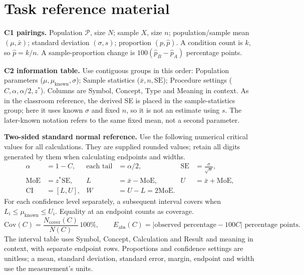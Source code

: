 \clearpage
\section*{Task reference material}
\textbf{C1 pairings.} Population $\mathcal P$, size $N$; sample $X$, size $n$; population/sample mean $(\mu,\bar x)$; standard deviation $(\sigma,s)$; proportion $(p,\hat p)$. A condition count is $k$, so $\hat p=k/n$. A sample-proportion change is $100(\hat p_B-\hat p_A)$ percentage points.

\textbf{C2 information table.} Use contiguous groups in this order: Population parameters ($\mu,\mu_{\mathrm{known}},\sigma$); Sample statistics ($\bar x,n,\mathrm{SE}$); Procedure settings ($C,\alpha,\alpha/2,z^*$). Columns are Symbol, Concept, Type and Meaning in context. As in the classroom reference, the derived SE is placed in the sample-statistics group; here it uses known $\sigma$ and fixed $n$, so it is not an estimate using $s$. The later-known notation refers to the same fixed mean, not a second parameter.

\textbf{Two-sided standard normal reference.} Use the following numerical critical values for all calculations. They are supplied rounded values; retain all digits generated by them when calculating endpoints and widths.
\[
\begin{aligned}
\alpha&=1-C,& \text{each tail}&=\alpha/2,&\mathrm{SE}&=\frac{\sigma}{\sqrt n},\\
\mathrm{MoE}&=z^*\mathrm{SE},&L&=\bar x-\mathrm{MoE},&U&=\bar x+\mathrm{MoE},\\
\mathrm{CI}&=[L,U],&W&=U-L=2\mathrm{MoE}.&&
\end{aligned}
\]
For each confidence level separately, a subsequent interval covers when
$L_i\leq\mu_{\mathrm{known}}\leq U_i$. Equality at an endpoint counts as coverage.
\[
\mathrm{Cov}(C)=\frac{N_{\mathrm{cover}}(C)}{N(C)}\,100\%,\qquad
E_{\mathrm{abs}}(C)=|\text{observed percentage}-100C|\text{ percentage points}.
\]
The interval table uses Symbol, Concept, Calculation and Result and meaning in context, with separate endpoint rows. Proportions and confidence settings are unitless; a mean, standard deviation, standard error, margin, endpoint and width use the measurement's units.

